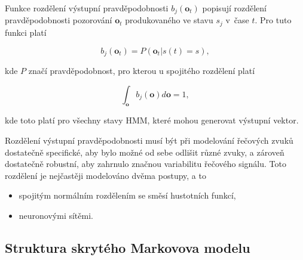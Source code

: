 \noindent Funkce rozdělení výstupní pravděpodobnosti $b_j\left(\boldsymbol{o}_t\right)$ popisují rozdělení pravděpodobnosti pozorování $\boldsymbol{o}_t$ produkovaného ve stavu $s_j$ v~čase $t$. Pro tuto funkci platí

\begin{equation}
  b_j\left(\boldsymbol{o}_t\right) = P\left(\boldsymbol{o}_t|s\left(t\right)=s\right),
  \label{eq:asr:acoustic:state:output}
\end{equation}

\noindent kde $P$ značí pravděpodobnost, pro kterou u spojitého rozdělení platí

\begin{equation}
  \int_{\boldsymbol{o}} b_j\left(\boldsymbol{o}\right)d\boldsymbol{o} = 1,
  \label{eq:asr:acoustic:state:output:condition:continous}
\end{equation}

\noindent kde toto platí pro všechny stavy HMM, které mohou generovat výstupní vektor.






Rozdělení výstupní pravděpodobnosti musí být při modelování řečových zvuků dostatečně specifické, aby bylo možné od sebe odlišit různé zvuky, a zároveň dostatečně robustní, aby zahrnulo značnou variabilitu řečového signálu. Toto rozdělení je nejčastěji modelováno dvěma postupy, a to

\begin{itemize}
  \item spojitým normálním rozdělením se směsí hustotních funkcí,
  \item neuronovými sítěmi.
\end{itemize}

\subsection{Struktura skrytého Markovova modelu}
\label{chap:asr:acoustic:HMM}

